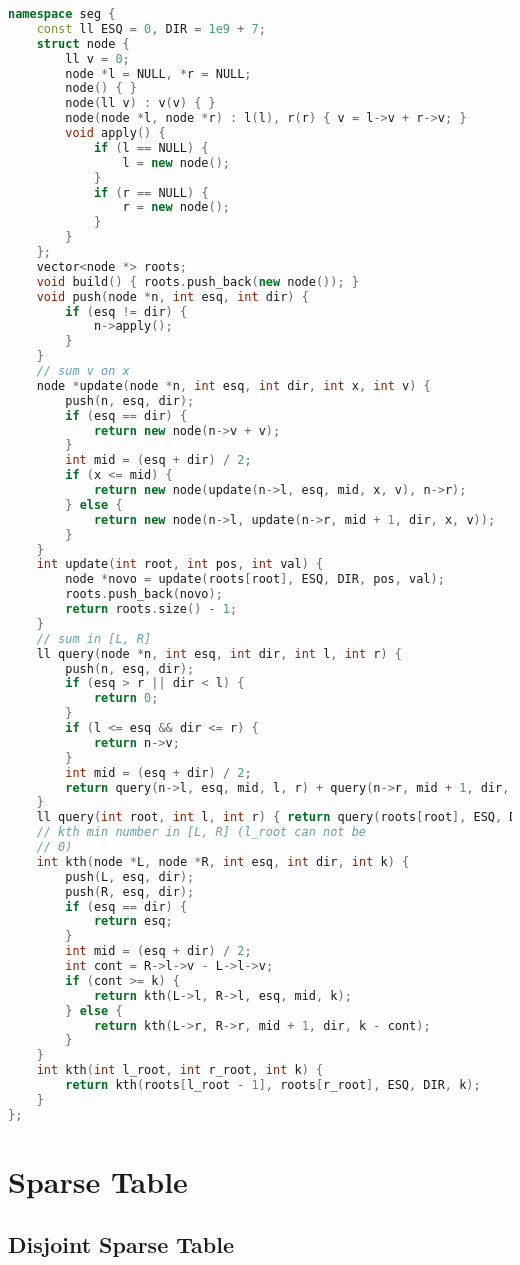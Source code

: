 \documentclass[10pt, a4paper, oneside]{book}
\begin{document}
\begin{lstlisting}[language=C++]
namespace seg {
    const ll ESQ = 0, DIR = 1e9 + 7;
    struct node {
        ll v = 0;
        node *l = NULL, *r = NULL;
        node() { }
        node(ll v) : v(v) { }
        node(node *l, node *r) : l(l), r(r) { v = l->v + r->v; }
        void apply() {
            if (l == NULL) {
                l = new node();
            }
            if (r == NULL) {
                r = new node();
            }
        }
    };
    vector<node *> roots;
    void build() { roots.push_back(new node()); }
    void push(node *n, int esq, int dir) {
        if (esq != dir) {
            n->apply();
        }
    }
    // sum v on x
    node *update(node *n, int esq, int dir, int x, int v) {
        push(n, esq, dir);
        if (esq == dir) {
            return new node(n->v + v);
        }
        int mid = (esq + dir) / 2;
        if (x <= mid) {
            return new node(update(n->l, esq, mid, x, v), n->r);
        } else {
            return new node(n->l, update(n->r, mid + 1, dir, x, v));
        }
    }
    int update(int root, int pos, int val) {
        node *novo = update(roots[root], ESQ, DIR, pos, val);
        roots.push_back(novo);
        return roots.size() - 1;
    }
    // sum in [L, R]
    ll query(node *n, int esq, int dir, int l, int r) {
        push(n, esq, dir);
        if (esq > r || dir < l) {
            return 0;
        }
        if (l <= esq && dir <= r) {
            return n->v;
        }
        int mid = (esq + dir) / 2;
        return query(n->l, esq, mid, l, r) + query(n->r, mid + 1, dir, l, r);
    }
    ll query(int root, int l, int r) { return query(roots[root], ESQ, DIR, l, r); }
    // kth min number in [L, R] (l_root can not be
    // 0)
    int kth(node *L, node *R, int esq, int dir, int k) {
        push(L, esq, dir);
        push(R, esq, dir);
        if (esq == dir) {
            return esq;
        }
        int mid = (esq + dir) / 2;
        int cont = R->l->v - L->l->v;
        if (cont >= k) {
            return kth(L->l, R->l, esq, mid, k);
        } else {
            return kth(L->r, R->r, mid + 1, dir, k - cont);
        }
    }
    int kth(int l_root, int r_root, int k) {
        return kth(roots[l_root - 1], roots[r_root], ESQ, DIR, k);
    }
};
\end{lstlisting}
\hfill

\section{Sparse Table}
\subsection{Disjoint Sparse Table}
\end{document}
